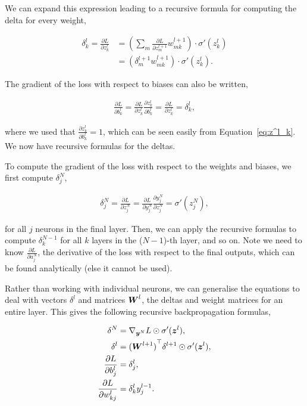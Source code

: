 We can expand this expression leading to a recursive formula for computing the delta for every weight,

\begin{align}
    \delta^l_k = \frac{\partial L}{\partial z^l_k} &= \left(
        \sum_{m} \frac{\partial L}{\partial z^{l+1}_m} w^{l+1}_{mk}
    \right) \cdot
    \sigma'(z^l_k) \\
    &= \left(
        \delta^{l+1}_m w^{l+1}_{mk}
    \right) \cdot
    \sigma'(z^l_k).
\end{align}

The gradient of the loss with respect to biases can also be written,

\begin{align}
    \frac{\partial L}{\partial b^l_k} = \frac{\partial L}{\partial z^l_k} \frac{\partial z^l_k}{\partial b^l_k} = \frac{\partial L}{\partial z^l_k} = \delta^l_k,
\end{align}

where we used that \(\frac{\partial z^l_k}{\partial b^l_k} = 1\), which can be seen easily from Equation~\ref{eq:z^l_k}.
We now have recursive formulas for the deltas.

To compute the gradient of the loss with respect to the weights and biases, we first compute \(\delta^N_j\),

\begin{align}
    \delta^N_j = \frac{\partial L}{\partial z^N_j} = \frac{\partial L}{\partial y^N_j} \frac{\partial y^N_j}{\partial z^N_j} = \sigma'(z^N_j),
\end{align}

for all \(j\) neurons in the final layer. Then, we can apply the recursive formulas to compute \(\delta^{N-1}_k\) for all \(k\) layers in the (\(N-1\))-th layer, and so on.
Note we need to know \(\frac{\partial L}{\partial a^N_j}\), the derivative of the loss with respect to the final outputs, which can be found analytically (else it cannot be used).

Rather than working with individual neurons, we can generalise the equations to deal with vectors \(\delta^l\) and matrices \({\boldsymbol{{W}}}^l\), the deltas and weight matrices for an entire layer.
This gives the following recursive backpropagation formulas,

\begin{align}
    \delta^N &= \nabla_{{\boldsymbol{{y}}}^N} L \odot \sigma'({\boldsymbol{{z}}}^l), \\
    \delta^l &= {({\boldsymbol{{W}}}^{l+1})}^{\top} \delta^{l+1} \odot \sigma'({\boldsymbol{{z}}}^l), \\
    \frac{\partial L}{\partial b^l_j} &= \delta^l_j, \\
    \frac{\partial L}{\partial w^l_{kj}} &= \delta^l_k y^{l-1}_j.
\end{align}


